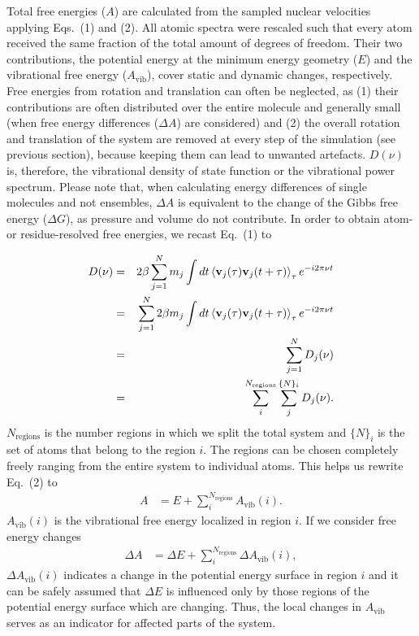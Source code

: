 \documentclass[12pt, english, letter]{article}
\newcommand{\avib}{A_\mathrm{vib}}
\begin{document}
	Total free energies ($A$) are calculated from the sampled nuclear velocities applying Eqs.~(1) and (2). All atomic spectra were rescaled such that every atom received the same fraction of the total amount of degrees of freedom. Their two contributions, the potential energy at the minimum energy geometry ($E$) and the vibrational free energy ($\avib$), cover static and dynamic changes, respectively. Free energies from rotation and translation can often be neglected, as (1) their contributions are often distributed over the entire molecule and generally small (when free energy differences ($\Delta A$) are considered) and (2) the overall rotation and translation of the system are removed at every step of the simulation (see previous section), because keeping them can lead to unwanted artefacts. $D(\nu)$ is, therefore, the vibrational density of state function or the vibrational power spectrum. Please note that, when calculating energy differences of single molecules and not ensembles, $\Delta A$ is equivalent to the change of the Gibbs free energy ($\Delta G$), as pressure and volume do not contribute. In order to obtain atom- or residue-resolved free energies, we recast Eq.~(1) to
	
	\begin{eqnarray}
	D(\nu) & = & 2 \beta \sum \limits_{j = 1}^{N} m_j \int dt
	\braket{\mathbf{v}_j (\tau) \mathbf{v}_j (t + \tau)}_{\tau} e^{-i 2\pi \nu t} \nonumber \\
	& = & \sum \limits_{j = 1}^{N} 2 \beta m_j \int dt
	\braket{\mathbf{v}_j (\tau) \mathbf{v}_j (t + \tau)}_{\tau} e^{-i 2\pi \nu t} \nonumber \\ 
	& = & \sum \limits_{j = 1}^{N} D_j(\nu) \nonumber \\ 
	& = & \sum \limits_{i}^{N_\mathrm{regions}} \sum \limits_{j}^{\{N\}_i} D_j(\nu).
	\end{eqnarray}
	$N_\mathrm{regions}$ is the number regions in which we split the total system and $\{N\}_i$ is the set of atoms that belong to the region $i$. The regions can be chosen completely freely ranging from the entire system to individual atoms.  This helps us rewrite Eq.~(2) to
	\begin{eqnarray}
	A & = E + \sum \limits_{i}^{N_\mathrm{regions}} \avib{}(i).
	\end{eqnarray}
	$\avib{}(i)$ is the vibrational free energy localized in region $i$. If we consider free energy changes
	\begin{eqnarray}
	\Delta A & = \Delta E + \sum \limits_{i}^{N_\mathrm{regions}} \Delta  \avib{}(i),
	\end{eqnarray}
	$\Delta  \avib{}(i)$ indicates a change in the potential energy surface in region $i$ and it can be safely assumed that $\Delta E$ is influenced only by those regions of the potential energy surface which are changing. Thus, the local changes in $\avib{}$ serves as an indicator for affected parts of the system. 
\end{document}
